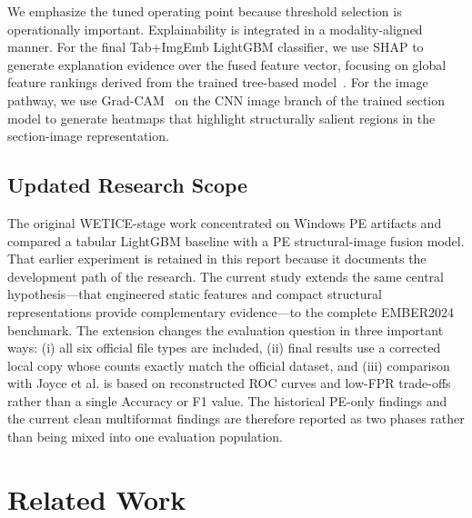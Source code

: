 \documentclass[conference]{IEEEtran}
\begin{document}


We emphasize the tuned operating point because threshold selection is operationally important.
Explainability is integrated in a modality-aligned manner.
For the final Tab+ImgEmb LightGBM classifier, we use SHAP to generate explanation evidence over the fused feature vector, focusing on global feature rankings derived from the trained tree-based model~\cite{LL2017}.
For the image pathway, we use Grad-CAM~\cite{SCDVPB2017} on the CNN image branch of the trained section model to generate heatmaps that highlight structurally salient regions in the section-image representation.
%




\subsection*{Updated Research Scope}
The original WETICE-stage work concentrated on Windows PE artifacts and compared a tabular LightGBM baseline with a PE structural-image fusion model. That earlier experiment is retained in this report because it documents the development path of the research. The current study extends the same central hypothesis---that engineered static features and compact structural representations provide complementary evidence---to the complete EMBER2024 benchmark. The extension changes the evaluation question in three important ways: (i) all six official file types are included, (ii) final results use a corrected local copy whose counts exactly match the official dataset, and (iii) comparison with Joyce et al. is based on reconstructed ROC curves and low-FPR trade-offs rather than a single Accuracy or F1 value. The historical PE-only findings and the current clean multiformat findings are therefore reported as two phases rather than being mixed into one evaluation population.

\section{Related Work}
\label{section:literature-review}
\end{document}
